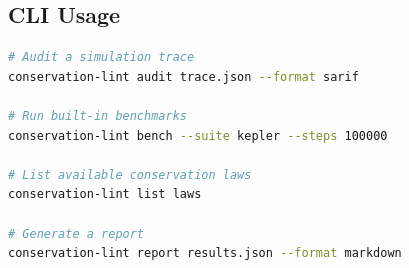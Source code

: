 \documentclass[11pt,a4paper]{article}
\begin{document}
\subsection{CLI Usage}

\begin{lstlisting}[language=bash,caption={Command-line interface examples.}]
# Audit a simulation trace
conservation-lint audit trace.json --format sarif

# Run built-in benchmarks
conservation-lint bench --suite kepler --steps 100000

# List available conservation laws
conservation-lint list laws

# Generate a report
conservation-lint report results.json --format markdown
\end{lstlisting}


\end{document}
